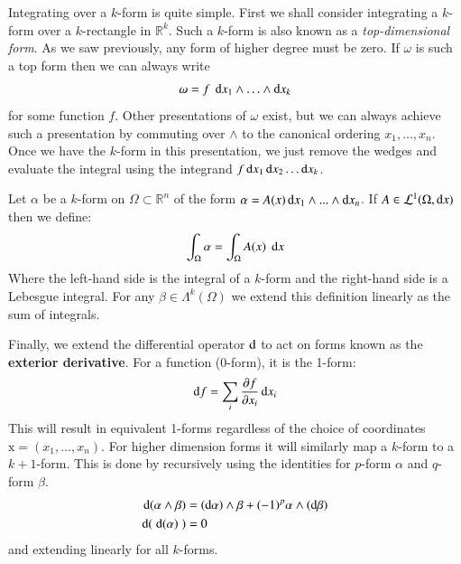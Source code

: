 Integrating over a $k$-form is quite simple.
First we shall consider integrating a $k$-form over a $k$-rectangle in $\mathbb{R}^k$.
Such a $k$-form is also known as a \emph{top-dimensional form}.
As we saw previously, any form of higher degree must be zero.
If $\omega$ is such a top form then we can always write
\begin{equation*}
	\omega = f \; \mathop{}\!\mathrm{d} x_1 \wedge \ldots \wedge \mathop{}\!\mathrm{d} x_k
\end{equation*}
for some function $f$.
Other presentations of $\omega$ exist, but we can always achieve such a presentation by commuting over $\wedge$ 
to the canonical ordering $x_1, \ldots, x_n$.
Once we have the $k$-form in this presentation, we just remove the wedges and evaluate the integral using the
integrand $f \mathop{}\!\mathrm{d} x_1 \mathop{}\!\mathrm{d} x_2 \ldots \mathop{}\!\mathrm{d} x_k$.

\begin{definition}
	Let $\alpha$ be a $k$-form on $\Omega \subset \mathbb{R}^n$ of the form 
	$\alpha = A(x) \mathop{}\!\mathrm{d} x_1 \wedge ... \wedge \mathop{}\!\mathrm{d} x_n$.
	If $A \in \mathcal{L}^1 (\Omega , \mathop{}\!\mathrm{d} x)$ then we define:
	\begin{equation}
		\int_\Omega \alpha = \int_\Omega A(x) \; \mathop{}\!\mathrm{d} x
	\end{equation}
	Where the left-hand side is the integral of a $k$-form and the right-hand side is a Lebesgue integral.
	For any $\beta \in \Lambda^k (\Omega)$ we extend this definition linearly as the sum of integrals.
\end{definition}

Finally, we extend the differential operator $\mathop{}\!\mathrm{d}$ to act on forms known as the \textbf{exterior derivative}.
For a function (0-form), it is the 1-form:
\begin{equation}
	\mathop{}\!\mathrm{d} f = \sum_i \frac{\partial f}{\partial x_i} \mathop{}\!\mathrm{d} x_i
\end{equation}
This will result in equivalent 1-forms regardless of the choice of coordinates $\text{x} = (x_1, \ldots, x_n)$.
For higher dimension forms it will similarly map a $k$-form to a $k+1$-form.
This is done by recursively using the identities for $p$-form $\alpha$ and $q$-form $\beta$.
\begin{align}
	\mathop{}\!\mathrm{d} (\alpha \wedge \beta) &= (\mathop{}\!\mathrm{d} \alpha) \wedge \beta + (-1)^p \alpha \wedge ( \mathop{}\!\mathrm{d} \beta) \\
	\mathop{}\!\mathrm{d} (\;\mathop{}\!\mathrm{d} ( \alpha )\; ) &= 0
\end{align}
and extending linearly for all $k$-forms.



